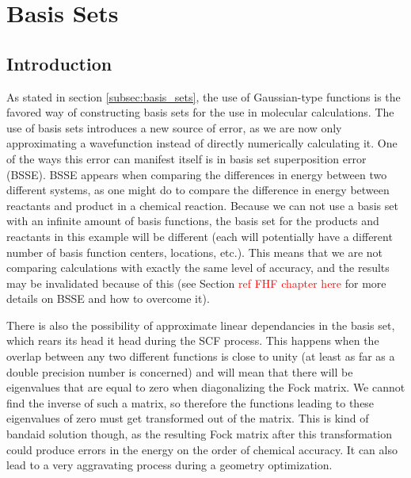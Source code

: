 \documentclass[12pt]{report}
\newcommand{\notetodylan}[1]{\textcolor{red}{#1}} %
\begin{document}
\chapter{Basis Sets}
\label{chap:basis_sets}
\section{Introduction}
As stated in section \ref{subsec:basis_sets}, the use of Gaussian-type functions is the favored way of constructing basis sets for the use in molecular calculations. The use of basis sets introduces a new source of error, as we are now only approximating a wavefunction instead of directly numerically calculating it. One of the ways this error can manifest itself is in basis set superposition error (BSSE). BSSE appears when comparing the differences in energy between two different systems, as one might do to compare the difference in energy between reactants and product in a chemical reaction. Because we can not use a basis set with an infinite amount of basis functions, the basis set for the products and reactants in this example will be different (each will potentially have a different number of basis function centers, locations, etc.). This means that we are not comparing calculations with exactly the same level of accuracy, and the results may be invalidated because of this (see Section \notetodylan{ref FHF chapter here} for more details on BSSE and how to overcome it). 

There is also the possibility of approximate linear dependancies in the basis set, which rears its head it head during the SCF process. This happens when the overlap between any two different functions is close to unity (at least as far as a double precision number is concerned) and will mean that there will be eigenvalues that are equal to zero when diagonalizing the Fock matrix. We cannot find the inverse of such a matrix, so therefore the functions leading to these eigenvalues of zero must get transformed out of the matrix. This is kind of bandaid solution though, as the resulting Fock matrix after this transformation could produce errors in the energy on the order of chemical accuracy. It can also lead to a very aggravating process during a geometry optimization. 
\end{document}
